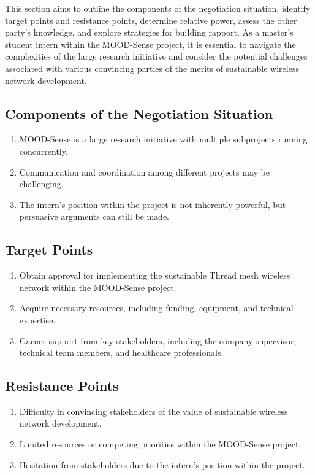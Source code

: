 This section aims to outline the components of the negotiation situation, identify target points and resistance points, determine relative power, assess the other party's knowledge, and explore strategies for building rapport. As a master's student intern within the MOOD-Sense project, it is essential to navigate the complexities of the large research initiative and consider the potential challenges associated with various convincing parties of the merits of sustainable wireless network development.

\subsection*{Components of the Negotiation Situation}

\begin{enumerate}
    \item MOOD-Sense is a large research initiative with multiple subprojects running concurrently.
    \item Communication and coordination among different projects may be challenging.
    \item The intern's position within the project is not inherently powerful, but persuasive arguments can still be made.
\end{enumerate}

\subsection*{Target Points}

\begin{enumerate}
    \item Obtain approval for implementing the sustainable Thread mesh wireless network within the MOOD-Sense project.
    \item Acquire necessary resources, including funding, equipment, and technical expertise.
    \item Garner support from key stakeholders, including the company supervisor, technical team members, and healthcare professionals.
\end{enumerate}

\subsection*{Resistance Points}

\begin{enumerate}
    \item Difficulty in convincing stakeholders of the value of sustainable wireless network development.
    \item Limited resources or competing priorities within the MOOD-Sense project.
    \item Hesitation from stakeholders due to the intern's position within the project.
\end{enumerate}

